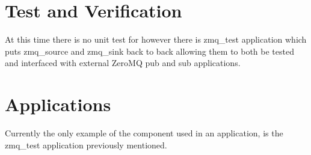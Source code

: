\section*{Test and Verification}
	At this time there is no unit test for {\comp} however there is zmq\_test application which puts zmq\_source and zmq\_sink back to back allowing them to both be tested and interfaced with external ZeroMQ pub and sub applications.


\section*{Applications}
Currently the only example of the {\comp} component used in an application, is the zmq\_test application previously mentioned.



